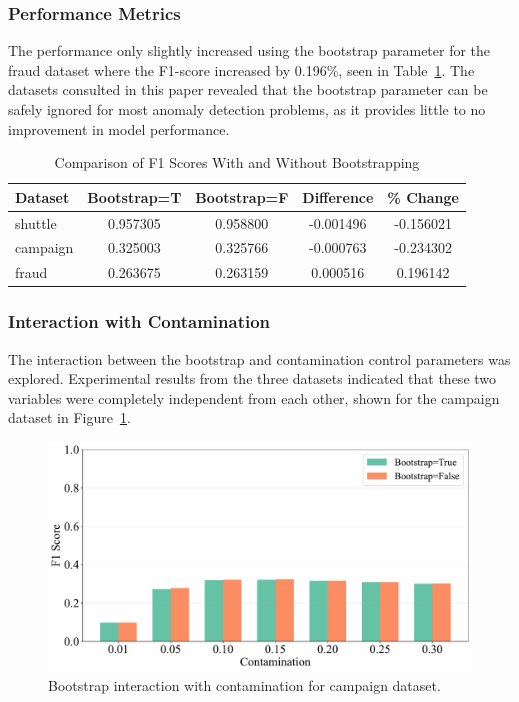 \documentclass[10pt, conference]{IEEEtran}
\begin{document}
\subsubsection{Performance Metrics}
The performance only slightly increased using the bootstrap parameter for the fraud dataset where the F1-score  increased by 0.196\%, seen in Table~\ref{tab:bootstrap_comparison}. The datasets consulted in this paper revealed that the bootstrap parameter can be safely ignored for most anomaly detection problems, as it provides little to no improvement in model performance.
\begin{table}[htbp]
	\caption{Comparison of F1 Scores With and Without Bootstrapping}
	\centering
	\begin{tabular}{|l|c|c|c|c|}
		\hline
		\textbf{Dataset} & \textbf{Bootstrap=T} & \textbf{Bootstrap=F} & \textbf{Difference} & \textbf{\% Change} \\ 
		\hline
		shuttle & 0.957305 & 0.958800 & -0.001496 & -0.156021 \\ 
		\hline
		campaign & 0.325003 & 0.325766 & -0.000763 & -0.234302 \\ 
		\hline
		fraud & 0.263675 & 0.263159 & 0.000516 & 0.196142 \\ 
		\hline
	\end{tabular}
	\label{tab:bootstrap_comparison}
\end{table}



\subsubsection{Interaction with Contamination}

The interaction between the bootstrap and contamination control parameters was explored. Experimental results from the three datasets indicated that these two variables were completely independent from each other, shown for the campaign dataset in Figure~\ref{fig:bootstrap_int_campaign}. 


\begin{figure}[H]
	\centering
	\includegraphics[width=0.95\linewidth]{../results/campaign/bootstrap/bootstrap_contamination_interaction.pdf}
	\caption{Bootstrap interaction with contamination for campaign dataset.}
	\label{fig:bootstrap_int_campaign}
\end{figure}
\end{document}

